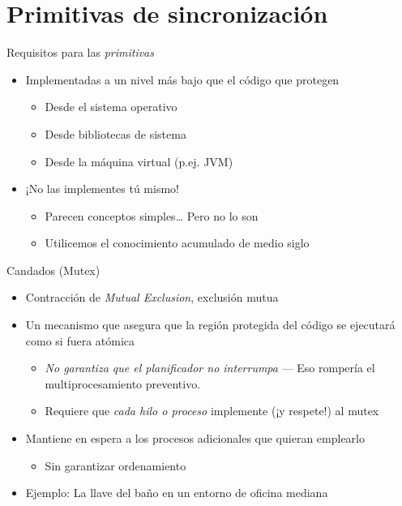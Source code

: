 \documentclass[presentation]{beamer}
\begin{document}
\section{Primitivas de sincronización}
\label{sec:org991856c}
\begin{frame}[label={sec:org8d8ac2c}]{Requisitos para las \emph{primitivas}}
\begin{itemize}
\item Implementadas a un nivel más bajo que el código que protegen
\begin{itemize}
\item Desde el sistema operativo
\item Desde bibliotecas de sistema
\item Desde la máquina virtual (p.ej. JVM)
\end{itemize}
\item ¡No las implementes tú mismo!
\begin{itemize}
\item Parecen conceptos simples\ldots{} Pero no lo son
\item Utilicemos el conocimiento acumulado de medio siglo
\end{itemize}
\end{itemize}
\end{frame}
\begin{frame}[label={sec:orgf47787b}]{Candados (Mutex)}
\begin{itemize}
\item Contracción de \emph{Mutual Exclusion}, exclusión mutua
\item Un mecanismo que asegura que la región protegida del código se
ejecutará como si fuera atómica
\begin{itemize}
\item \emph{No garantiza que el planificador no interrumpa} — Eso rompería el
multiprocesamiento preventivo.
\item Requiere que \emph{cada hilo o proceso} implemente (¡y respete!) al
mutex
\end{itemize}
\item Mantiene en espera a los procesos adicionales que quieran emplearlo
\begin{itemize}
\item Sin garantizar ordenamiento
\end{itemize}
\end{itemize}
\pause
\begin{itemize}
\item Ejemplo: La llave del baño en un entorno de oficina mediana
\end{itemize}
\end{frame}
\end{document}
